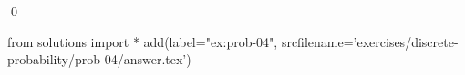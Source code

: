 
\begin{ex} 
  \label{ex:prob-04}
  
  \qed
\end{ex} 
\begin{python0}
from solutions import *
add(label="ex:prob-04",
    srcfilename='exercises/discrete-probability/prob-04/answer.tex') 
\end{python0}
